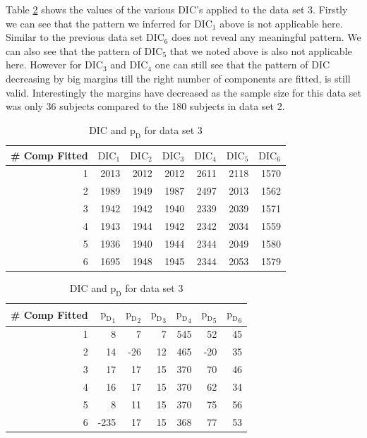 Table \ref{table : ds_3wellsep_3ppg_dic} shows the values of the various DIC's applied to the data set 3. Firstly we can see that the pattern we inferred for $\text{DIC}_1$ above is not applicable here. Similar to the previous data set $\text{DIC}_6$ does not reveal any meaningful pattern. We can also see that the pattern of $\text{DIC}_5$ that we noted above is also not applicable here. However for $\text{DIC}_3$ and $\text{DIC}_4$ one can still see that the pattern of DIC decreasing by big margins till the right number of components are fitted, is still valid. Interestingly the margins have decreased as the sample size for this data set was only 36 subjects compared to the 180 subjects in data set 2.

\begin{table}[!htb]
\centering
\caption{DIC and $\text{p}_\text{D}$ for data set 3}
\label{table : ds_3wellsep_3ppg_dic}
\begin{tabular}{@{}rrrrrrr@{}}
\toprule
\# Comp Fitted & $\text{DIC}_1$ & $\text{DIC}_2$  & $\text{DIC}_3$  & $\text{DIC}_4$  & $\text{DIC}_5$  & $\text{DIC}_6$  \\ \midrule
1 & 2013 & 2012 & 2012 & 2611 & 2118 & 1570 \\
2 & 1989 & 1949 & 1987 & 2497 & 2013 & 1562 \\
3 & 1942 & 1942 & 1940 & 2339 & 2039 & 1571 \\
4 & 1943 & 1944 & 1942 & 2342 & 2034 & 1559 \\
5 & 1936 & 1940 & 1944 & 2344 & 2049 & 1580 \\
6 & 1695 & 1948 & 1945 & 2344 & 2053 & 1579 \\ \bottomrule
\end{tabular}

\begin{tabular}{@{}rrrrrrr@{}}
\toprule
\# Comp Fitted & ${\text{p}_\text{D}}_1$ & ${\text{p}_\text{D}}_2$ & ${\text{p}_\text{D}}_3$ & ${\text{p}_\text{D}}_4$ & ${\text{p}_\text{D}}_5$ & ${\text{p}_\text{D}}_6$ \\ \midrule
1 & 8 & 7 & 7 & 545 & 52 & 45 \\
2 & 14 & -26 & 12 & 465 & -20 & 35 \\
3 & 17 & 17 & 15 & 370 & 70 & 46 \\
4 & 16 & 17 & 15 & 370 & 62 & 34 \\
5 & 8 & 11 & 15 & 370 & 75 & 56 \\
6 & -235 & 17 & 15 & 368 & 77 & 53 \\ \bottomrule
\end{tabular}
\end{table}

